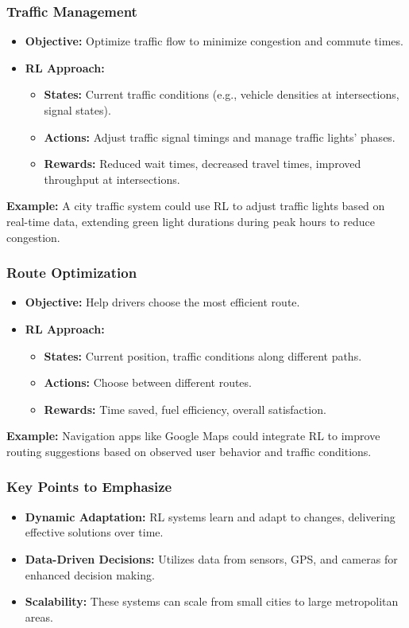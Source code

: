 \documentclass[aspectratio=169]{beamer}
\begin{document}
\begin{frame}[fragile]
  \frametitle{Traffic Management}
  \begin{itemize}
    \item \textbf{Objective:} Optimize traffic flow to minimize congestion and commute times.
    \item \textbf{RL Approach:}
      \begin{itemize}
        \item \textbf{States:} Current traffic conditions (e.g., vehicle densities at intersections, signal states).
        \item \textbf{Actions:} Adjust traffic signal timings and manage traffic lights' phases.
        \item \textbf{Rewards:} Reduced wait times, decreased travel times, improved throughput at intersections.
      \end{itemize}
  \end{itemize}
  
  \textbf{Example:} A city traffic system could use RL to adjust traffic lights based on real-time data, extending green light durations during peak hours to reduce congestion.
\end{frame}

\begin{frame}[fragile]
  \frametitle{Route Optimization}
  \begin{itemize}
    \item \textbf{Objective:} Help drivers choose the most efficient route.
    \item \textbf{RL Approach:}
      \begin{itemize}
        \item \textbf{States:} Current position, traffic conditions along different paths.
        \item \textbf{Actions:} Choose between different routes.
        \item \textbf{Rewards:} Time saved, fuel efficiency, overall satisfaction.
      \end{itemize}
  \end{itemize}

  \textbf{Example:} Navigation apps like Google Maps could integrate RL to improve routing suggestions based on observed user behavior and traffic conditions.
\end{frame}

\begin{frame}[fragile]
  \frametitle{Key Points to Emphasize}
  \begin{itemize}
    \item \textbf{Dynamic Adaptation:} RL systems learn and adapt to changes, delivering effective solutions over time.
    \item \textbf{Data-Driven Decisions:} Utilizes data from sensors, GPS, and cameras for enhanced decision making.
    \item \textbf{Scalability:} These systems can scale from small cities to large metropolitan areas.
  \end{itemize}
\end{frame}
\end{document}
